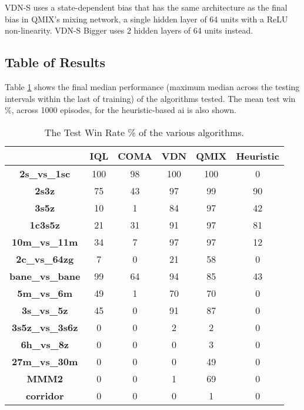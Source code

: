 \documentclass[twoside,11pt]{article}
\begin{document}
VDN-S uses a state-dependent bias that has the same architecture as the final bias in QMIX's mixing network, a single hidden layer of 64 units with a ReLU non-linearity.
VDN-S Bigger uses 2 hidden layers of 64 units instead.

\subsection{Table of Results}
\label{sec:table_results}

Table \ref{tab:hai} shows the final median performance (maximum median across the testing intervals within the last  of training) of the algorithms tested.
The mean test win \%, across 1000 episodes, for the heuristic-based ai is also shown.
\begin{table}[h]
    \setlength{\extrarowheight}{3pt}
    \centering
    \begin{center}
        \begin{tabular}{| c | c | c | c | c | c |}
        \hline
        ~&\textbf{IQL}&\textbf{COMA}&\textbf{VDN}&\textbf{QMIX}&\textbf{Heuristic}\\
        \hline \hline
\textbf{2s\_vs\_1sc} &
100&
 98&
100&
100&
0\\
\hline

\textbf{2s3z} &
 75&
 43&
 97&
 99&
90\\
\hline

\textbf{3s5z} &
 10&
  1&
 84&
 97&
42\\
\hline

\textbf{1c3s5z} &
 21&
 31&
 91&
 97&
81\\
\hline

\textbf{10m\_vs\_11m} &
 34&
  7&
 97&
 97&
12\\
\hline
\hline

\textbf{2c\_vs\_64zg} &
  7&
  0&
 21&
 58&
0\\
\hline

\textbf{bane\_vs\_bane} &
 99&
 64&
 94&
 85&
43\\
\hline

\textbf{5m\_vs\_6m} &
 49&
  1&
 70&
 70&
0\\
\hline

\textbf{3s\_vs\_5z} &
 45&
  0&
 91&
 87&
0\\
\hline
\hline

\textbf{3s5z\_vs\_3s6z} &
  0&
  0&
  2&
  2&
0\\
\hline

\textbf{6h\_vs\_8z} &
  0&
  0&
  0&
  3&
0\\
\hline

\textbf{27m\_vs\_30m} &
  0&
  0&
  0&
 49&
0\\
\hline

\textbf{MMM2} &
  0&
  0&
  1&
 69&
0\\
\hline

\textbf{corridor} &
  0&
  0&
  0&
  1&
0\\
\hline
        \end{tabular}
        \caption{The Test Win Rate \% of the various algorithms.}
    \end{center}
    \label{tab:hai}
\end{table}
\end{document}
